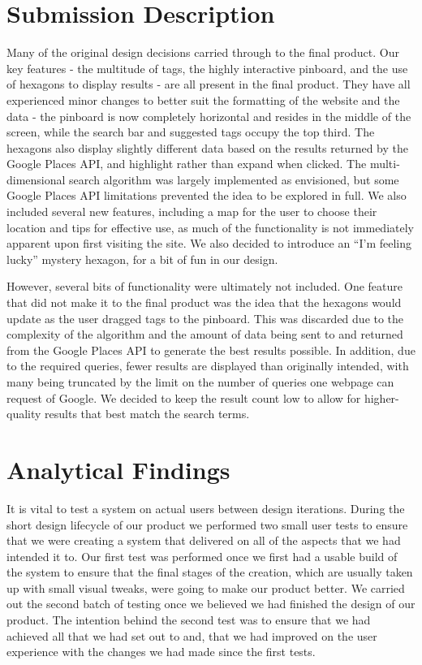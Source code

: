 \documentclass[10pt,a4paper]{article}
\begin{document}
\section*{Submission Description}

Many of the original design decisions carried through to the final product. Our key features - the multitude of tags, the highly interactive pinboard, and the use of hexagons to display results - are all present in the final product. They have all experienced minor changes to better suit the formatting of the website and the data - the pinboard is now completely horizontal and resides in the middle of the screen, while the search bar and suggested tags occupy the top third. The hexagons also display slightly different data based on the results returned by the Google Places API, and highlight rather than expand when clicked. The multi-dimensional search algorithm was largely implemented as envisioned, but some Google Places API limitations prevented the idea to be explored in full. We also included several new features, including a map for the user to choose their location and tips for effective use, as much of the functionality is not immediately apparent upon first visiting the site. We also decided to introduce an “I’m feeling lucky” mystery hexagon, for a bit of fun in our design.

However, several bits of functionality were ultimately not included. One feature that did not make it to the final product was the idea that the hexagons would update as the user dragged tags to the pinboard. This was discarded due to the complexity of the algorithm and the amount of data being sent to and returned from the Google Places API to generate the best results possible. In addition, due to the required queries, fewer results are displayed than originally intended, with many being truncated by the limit on the number of queries one webpage can request of Google. We decided to keep the result count low to allow for higher-quality results that best match the search terms.

\section*{Analytical Findings}

It is vital to test a system on actual users between design iterations. During the short design lifecycle of our product we performed two small user tests to ensure that we were creating a system that delivered on all of the aspects that we had intended it to. Our first test was performed once we first had a usable build of the system to ensure that the final stages of the creation, which are usually taken up with small visual tweaks, were going to make our product better. We carried out the second batch of testing once we believed we had finished the design of our product. The intention behind the second test was to ensure that we had achieved all that we had set out to and, that we had improved on the user experience with the changes we had made since the first tests.
\end{document}
